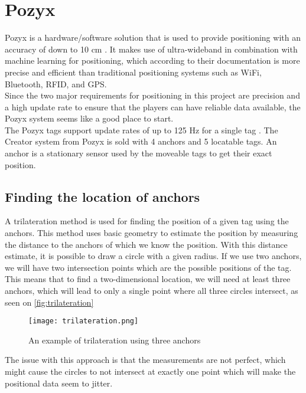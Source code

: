 \section{Pozyx}\label{sec:sprint1-pozyx}
Pozyx is a hardware/software solution that is used to provide positioning with an accuracy of down to 10 cm \cite{pozyx}.
It makes use of ultra-wideband in combination with machine learning for positioning, which according to their documentation is more precise and efficient than traditional positioning systems such as WiFi, Bluetooth, RFID, and GPS.
\\
Since the two major requirements for positioning in this project are precision and a high update rate to ensure that the players can have reliable data available, the Pozyx system seems like a good place to start.
\\
The Pozyx tags support update rates of up to 125 Hz for a single tag \cite{pozyx}.
The Creator system from Pozyx is sold with 4 anchors and 5 locatable tags.
An anchor is a stationary sensor used by the moveable tags to get their exact position.
\subsection{Finding the location of anchors}
A trilateration method is used for finding the position of a given tag using the anchors.
This method uses basic geometry to estimate the position by measuring the distance to the anchors of which we know the position.
With this distance estimate, it is possible to draw a circle with a given radius.
If we use two anchors, we will have two intersection points which are the possible positions of the tag.
This means that to find a two-dimensional location, we will need at least three anchors, which will lead to only a single point where all three circles intersect, as seen on \autoref{fig:trilateration}

\begin{figure}[H]
    \centering
    \texttt{[image: trilateration.png]}
    \caption{An example of trilateration using three anchors}
    \label{fig:trilateration}
\end{figure}

The issue with this approach is that the measurements are not perfect, which might cause the circles to not intersect at exactly one point which will make the positional data seem to jitter.

